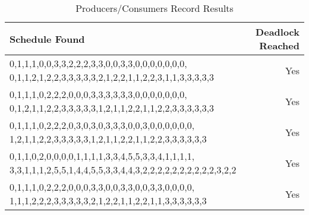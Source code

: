\vspace{3em}

\begin{table}
\label{tb:newres}
\caption{Producers/Consumers Record Results}

\begin{center}
\begin{tabular}{| l | r |} 
\hline
\textbf{Schedule Found} & \textbf{Deadlock Reached}\\ \hline
\specialcell{0,1,1,1,0,0,3,3,2,2,2,3,3,0,0,3,3,0,0,0,0,0,0,0,\\ 0,1,1,2,1,2,2,3,3,3,3,3,2,1,2,2,1,1,2,2,3,1,1,3,3,3,3,3} & Yes \\ \hline
\specialcell{0,1,1,1,0,2,2,2,0,0,0,3,3,3,3,3,3,0,0,0,0,0,0,0, \\ 0,1,2,1,1,2,2,3,3,3,3,3,1,2,1,1,2,2,1,1,2,2,3,3,3,3,3,3} & Yes  \\ \hline
\specialcell{0,1,1,1,0,2,2,2,0,3,0,3,0,3,3,3,0,0,3,0,0,0,0,0,0, \\ 1,2,1,1,2,2,3,3,3,3,3,1,2,1,1,2,2,1,1,2,2,3,3,3,3,3,3} & Yes \\ \hline
\specialcell{0,1,1,0,2,0,0,0,0,1,1,1,1,3,3,4,5,5,3,3,4,1,1,1,1, \\ 3,3,1,1,1,2,5,5,1,4,4,5,5,3,3,4,4,3,2,2,2,2,2,2,2,2,2,2,3,2,2}  & Yes \\ \hline
\specialcell{0,1,1,1,0,2,2,2,0,0,0,3,3,0,0,3,3,0,0,3,3,0,0,0,0, \\ 1,1,1,2,2,2,3,3,3,3,3,2,1,2,2,1,1,2,2,1,1,3,3,3,3,3,3} & Yes \\ \hline
\hline	
\end{tabular}
\end{center}
\end{table}
\vspace{3em}